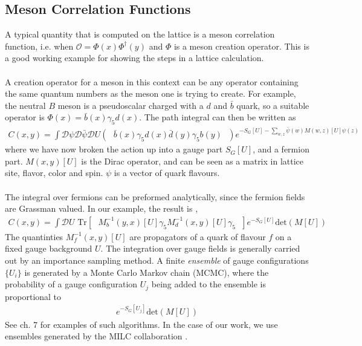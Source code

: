 \subsection{Meson Correlation Functions}
\label{sec:correlators}

A typical quantity that is computed on the lattice is a meson correlation function, i.e. when $\mathcal{O} = \Phi(x)\Phi^{\dagger}(y)$ and $\Phi$ is a meson creation operator. This is a good working example for showing the steps in a lattice calculation. 
\\ \\
A creation operator for a meson in this context can be any operator containing the same quantum numbers as the meson one is trying to create. For example, the neutral $B$ meson is a pseudoscalar charged with a $d$ and $\bar{b}$ quark, so a suitable operator is $\Phi(x) = \bar{b}(x)\gamma_5 d(x)$. The path integral can then be written as 
\begin{align}
	C(x,y) = \int \mathcal{D}\psi \mathcal{D}\bar{\psi} \mathcal{D}U \left(\text{ } \bar{b}(x)\gamma_5 d(x) \bar{d}(y)\gamma_5 b(y) \text{ }\right) e^{-S_G[U]-\sum_{w,z} \bar{\psi}(w)M(w,z)[U]\psi(z)}
\end{align}
where we have now broken the action up into a gauge part $S_G[U]$, and a fermion part. $M(x,y)[U]$ is the Dirac operator, and can be seen as a matrix in lattice site, flavor, color and spin. $\psi$ is a vector of quark flavours.
\\ \\
The integral over fermions can be preformed analytically, since the fermion fields are Grassman valued. In our example, the result is \cite{Peskin:1995ev},
\begin{align}
	C(x,y) = \int \mathcal{D}U \text{ Tr}\left[\text{ } M^{-1}_b(y,x)[U] \gamma_5 M^{-1}_d(x,y)[U] \gamma_5 \text{ }\right] e^{-S_G[U]} \text{det}(M[U])
\end{align}
The quantinties $M^{-1}_f(x,y)[U]$ are propagators of a quark of flavour $f$ on a fixed gauge background $U$. The integration over gauge fields is generally carried out by an importance sampling method. A finite \textit{ensemble} of gauge configurations $\{U_i\}$ is generated by a Monte Carlo Markov chain (MCMC), where the probability of a gauge configuration $U_j$ being added to the ensemble is proportional to 
\begin{align}
	e^{-S_G[U_j]}\text{det}(M[U])
	\label{eq:MCweight}
\end{align}
See \cite{DeGrand:2006zz} ch. 7 for examples of such algorithms. In the case of our work, we use ensembles generated by the MILC collaboration \cite{Bazavov:2012xda}.
